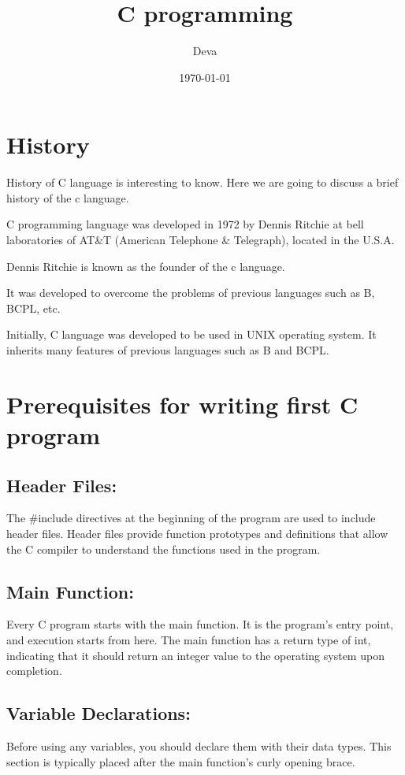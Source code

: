 \documentclass[11pt]{article}
\title{C programming}
\author{Deva}
\date{\today}
\begin{document}
\maketitle
\tableofcontents
\section{History}
History of C language is interesting to know. Here we are going to discuss a brief history of the c language.

C programming language was developed in 1972 by Dennis Ritchie at bell laboratories of AT\&T (American Telephone \& Telegraph), located in the U.S.A.

Dennis Ritchie is known as the founder of the c language.

It was developed to overcome the problems of previous languages such as B, BCPL, etc.

Initially, C language was developed to be used in UNIX operating system. It inherits many features of previous languages such as B and BCPL.
\section{Prerequisites for writing first C program}

\subsection{Header Files:}
The \#include directives at the beginning of the program are used to include header files. Header files provide function prototypes and definitions that allow the C compiler to understand the functions used in the program.

\subsection{Main Function:}
Every C program starts with the main function. It is the program's entry point, and execution starts from here. The main function has a return type of int, indicating that it should return an integer value to the operating system upon completion.

\subsection{Variable Declarations:}
Before using any variables, you should declare them with their data types. This section is typically placed after the main function's curly opening brace.
\end{document}
